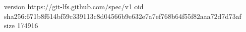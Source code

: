 version https://git-lfs.github.com/spec/v1
oid sha256:671b8f614bf59c339113c8d04566b9e632e7a7ef768b64f55f82aaa72d7d73af
size 174916
